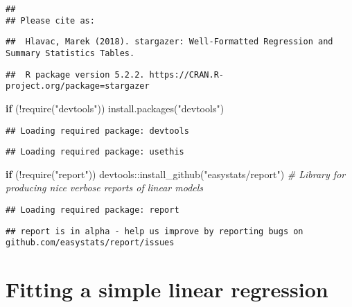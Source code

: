\documentclass[
]{book}
\newenvironment{Shaded}{\begin{snugshade}}{\end{snugshade}}
\newcommand{\CommentTok}[1]{\textcolor[rgb]{0.56,0.35,0.01}{\textit{#1}}}
\newcommand{\ControlFlowTok}[1]{\textcolor[rgb]{0.13,0.29,0.53}{\textbf{#1}}}
\newcommand{\FunctionTok}[1]{\textcolor[rgb]{0.00,0.00,0.00}{#1}}
\newcommand{\NormalTok}[1]{#1}
\newcommand{\SpecialCharTok}[1]{\textcolor[rgb]{0.00,0.00,0.00}{#1}}
\newcommand{\StringTok}[1]{\textcolor[rgb]{0.31,0.60,0.02}{#1}}
\begin{document}
\begin{verbatim}
## 
## Please cite as:
\end{verbatim}

\begin{verbatim}
##  Hlavac, Marek (2018). stargazer: Well-Formatted Regression and Summary Statistics Tables.
\end{verbatim}

\begin{verbatim}
##  R package version 5.2.2. https://CRAN.R-project.org/package=stargazer
\end{verbatim}

\begin{Shaded}
\begin{Highlighting}[]
\ControlFlowTok{if}\NormalTok{ (}\SpecialCharTok{!}\FunctionTok{require}\NormalTok{(}\StringTok{"devtools"}\NormalTok{)) }\FunctionTok{install.packages}\NormalTok{(}\StringTok{"devtools"}\NormalTok{)}
\end{Highlighting}
\end{Shaded}

\begin{verbatim}
## Loading required package: devtools
\end{verbatim}

\begin{verbatim}
## Loading required package: usethis
\end{verbatim}

\begin{Shaded}
\begin{Highlighting}[]
\ControlFlowTok{if}\NormalTok{ (}\SpecialCharTok{!}\FunctionTok{require}\NormalTok{(}\StringTok{"report"}\NormalTok{)) devtools}\SpecialCharTok{::}\FunctionTok{install\_github}\NormalTok{(}\StringTok{"easystats/report"}\NormalTok{) }\CommentTok{\# Library for producing nice verbose reports of linear models}
\end{Highlighting}
\end{Shaded}

\begin{verbatim}
## Loading required package: report
\end{verbatim}

\begin{verbatim}
## report is in alpha - help us improve by reporting bugs on github.com/easystats/report/issues
\end{verbatim}

\hypertarget{fitting-a-simple-linear-regression}{%
\section{Fitting a simple linear regression}\label{fitting-a-simple-linear-regression}}
\end{document}
